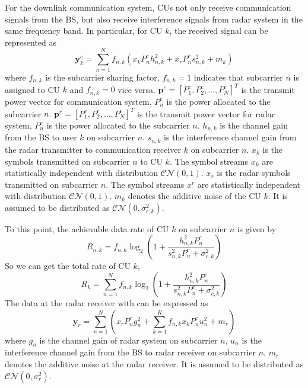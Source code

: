 \documentclass[a4paper,journal,10pt]{IEEEtran}
\begin{document}
For the downlink communication system, CUs not only receive communication signals from the BS, but also receive interference signals from radar system in the same frequency band. In particular, for CU $k$, the received signal can be represented as
\begin{equation}\label{CU-Signal}
	\bm{y}_{k}^c =\sum_{n=1}^{N}f_{n,k}\left( x_k P_n^c h_{n,k}^2 +x_rP_n^r s_{n,k}^2+m_{k}\right)
\end{equation}
where $f_{n,k}$ is the subcarrier sharing factor, $f_{n,k}=1$ indicates that subcarrier $n$ is assigned to CU $k$ and $f_{n,k} =0$ vice versa. $\bm{p}^c =[P_1^c, P_2^c, \dots,P_N^c]^T$ is the transmit power vector for communication system, $P_{n}^c$ is the power allocated to the subcarrier $n$. $\bm{p}^r =[P_1^r, P_2^r, \dots,P_N^r]^T$ is the transmit power vector for radar system, $P_{n}^r$ is the power allocated to the subcarrier $n$. $h_{n,k}$ is the channel gain from the BS to user $k$ on subcarrier $n$. $s_{n,k}$ is the interference channel gain from the radar transmitter to communication receiver $k$ on subcarrier $n$. $x_k$ is the symbols transmitted on subcarrier $n$ to CU $k$. The symbol streams $x_{k}$ are statistically independent with distribution $\mathcal{CN}(0,1)$. $x_r$ is the radar symbols transmitted on subcarrier $n$. The symbol streams $x^r$ are statistically independent with distribution $\mathcal{CN}(0,1)$. $m_{k}$ denotes the additive noise of the CU $k$. It is assumed to be distributed as $\mathcal{CN}(0,\sigma_{c,k}^2)$.


To this point, the achievable data rate of CU $k$ on subcarrier $n$ is given by 
\begin{equation}\label{subcarrier-rate-n}
	R_{n,k}=f_{n,k}\log_2\left(1+\frac{h_{n,k}^2P_{n}^c}{s_{n,k}^2P_{n}^r+\sigma_{c,k}^2}\right)
\end{equation}	
So we can get the total rate of CU $k$,
\begin{equation}\label{subcarrier-rate-k}
	R_{k}=\sum_{n=1}^{N}f_{n,k}\log_2\left(1+\frac{h_{n,k}^2P_{n}^c}{s_{n,k}^2P_{n}^r+\sigma_{c,k}^2}\right)
\end{equation}	
The data at the radar receiver with can be expressed as
\begin{equation}\label{Radar-Signal}
	\bm{y}_r=\sum_{n=1}^{N} (x_r P_n^r g_{n}^2+ \sum_{k=1}^{K}f_{n,k}x_k P_n^c u_{n}^2 +m_{r})
\end{equation}
where $g_n$ is the channel gain of radar system on subcarrier $n$, $u_n$ is the interference channel gain from the BS to radar receiver on subcarrier $n$. $m_r$ denotes the additive noise at the radar receiver. It is assumed to be distributed as $\mathcal{CN}(0,\sigma_{r}^2)$.
\end{document}
